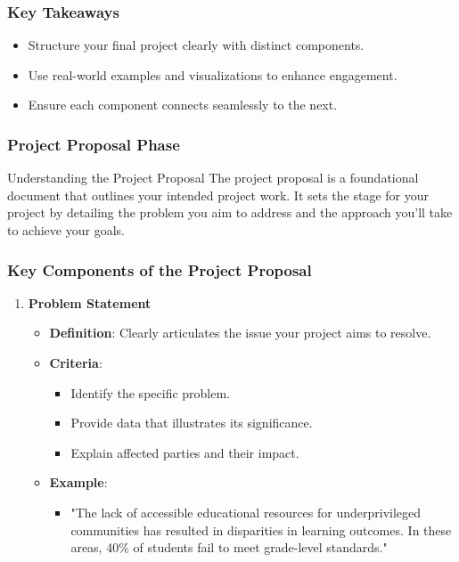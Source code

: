 \documentclass[aspectratio=169]{beamer}
\begin{document}
\begin{frame}[fragile]
    \frametitle{Key Takeaways}
    \begin{itemize}
        \item Structure your final project clearly with distinct components.
        \item Use real-world examples and visualizations to enhance engagement.
        \item Ensure each component connects seamlessly to the next.
    \end{itemize}
\end{frame}

\begin{frame}[fragile]
    \frametitle{Project Proposal Phase}
    \begin{block}{Understanding the Project Proposal}
        The project proposal is a foundational document that outlines your intended project work. It sets the stage for your project by detailing the problem you aim to address and the approach you'll take to achieve your goals.
    \end{block}
\end{frame}

\begin{frame}[fragile]
    \frametitle{Key Components of the Project Proposal}
    \begin{enumerate}
        \item \textbf{Problem Statement}
        \begin{itemize}
            \item \textbf{Definition}: Clearly articulates the issue your project aims to resolve.
            \item \textbf{Criteria}:
            \begin{itemize}
                \item Identify the specific problem.
                \item Provide data that illustrates its significance.
                \item Explain affected parties and their impact.
            \end{itemize}
            \item \textbf{Example}:
            \begin{itemize}
                \item "The lack of accessible educational resources for underprivileged communities has resulted in disparities in learning outcomes. In these areas, 40\% of students fail to meet grade-level standards."
            \end{itemize}
        \end{itemize}
    \end{enumerate}
\end{frame}
\end{document}

